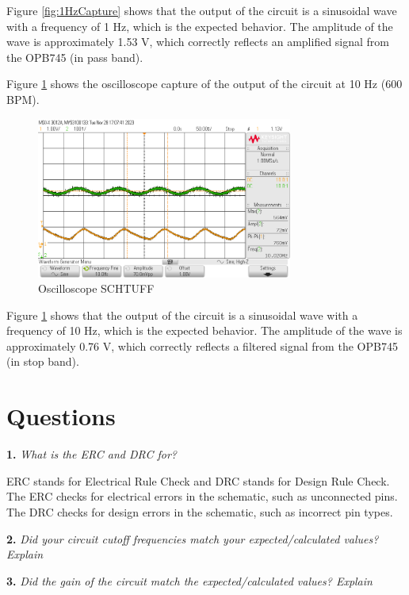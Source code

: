 \documentclass[CMPE]{KGCOEReport}
\begin{document}
Figure \ref{fig:1HzCapture} shows that the output of the circuit is a sinusoidal wave with a frequency of 1 Hz, which is the expected behavior. The amplitude of the wave is approximately 1.53 V, which correctly reflects an amplified signal from the OPB745 (in pass band).

Figure \ref{fig:10HzCapture} shows the oscilloscope capture of the output of the circuit at 10 Hz (600 BPM).

\begin{figure}[H]
    \centering
    \includegraphics[width=0.75\textwidth]{10Hz.png}
    \caption{Oscilloscope SCHTUFF}
    \label{fig:10HzCapture}
\end{figure}

Figure \ref{fig:10HzCapture} shows that the output of the circuit is a sinusoidal wave with a frequency of 10 Hz, which is the expected behavior. The amplitude of the wave is approximately 0.76 V, which correctly reflects a filtered signal from the OPB745 (in stop band).

\section*{Questions}

\textbf{1.} \emph{What is the ERC and DRC for?}

ERC stands for Electrical Rule Check and DRC stands for Design Rule Check. The ERC checks for electrical errors in the schematic, such as unconnected pins. The DRC checks for design errors in the schematic, such as incorrect pin types.

\bigskip

\textbf{2.} \emph{Did your circuit cutoff frequencies match your expected/calculated values? Explain}

\bigskip

\textbf{3.} \emph{Did the gain of the circuit match the expected/calculated values? Explain}
\end{document}
